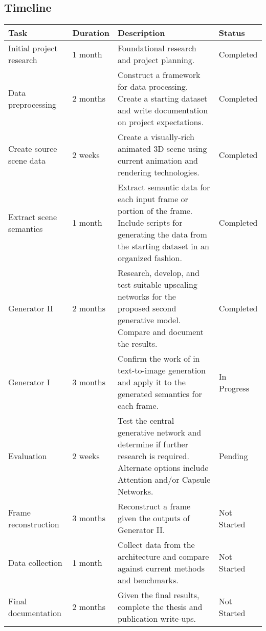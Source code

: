 \documentclass{article}
\begin{document}
\subsection{Timeline}
\label{subsec:timeline}
\begin{center}
\def\arraystretch{2.5}
\begin{tabular}{ | m{} | m{} | m{} | m{} | } 
\hline
\textbf{Task} & \textbf{Duration} & \textbf{Description} & \textbf{Status} \\ 
\hline
\hline
Initial project research & 1 month & Foundational research and project planning. & Completed \\
\hline
Data preprocessing & 2 months & Construct a framework for data processing. Create a starting dataset and write documentation on project expectations. & Completed\\
\hline
Create source scene data & 2 weeks & Create a visually-rich animated 3D scene using current animation and rendering technologies. & Completed\\
\hline
Extract scene semantics & 1 month & Extract semantic data for each input frame or portion of the frame. Include scripts for generating the data from the starting dataset in an organized fashion. & Completed \\
\hline
Generator II & 2 months & Research, develop, and test suitable upscaling networks for the proposed second generative model. Compare and document the results. & Completed \\
\hline
Generator I & 3 months & Confirm the work of \cite{leica} in text-to-image generation and apply it to the generated semantics for each frame. & In Progress \\
\hline
Evaluation & 2 weeks & Test the central generative network and determine if further research is required. Alternate options include Attention and/or Capsule Networks. & Pending \\
\hline
Frame reconstruction & 3 months & Reconstruct a frame given the outputs of Generator II. & Not Started \\
\hline
Data collection & 1 month & Collect data from the architecture and compare against current methods and benchmarks. & Not Started\\
\hline
Final documentation & 2 months & Given the final results, complete the thesis and publication write-ups. & Not Started\\
\hline
\end{tabular}
\end{center}

\nocite{pixel_cnn}



\end{document}
